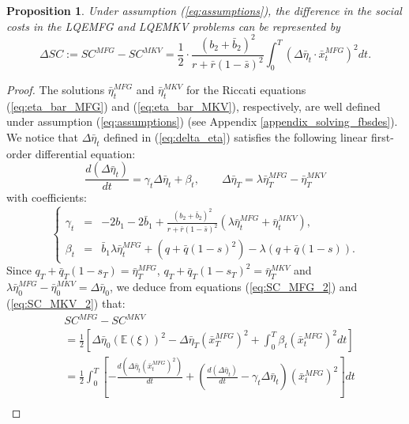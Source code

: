 \documentclass[11pt]{article}
\newtheorem{proposition}{Proposition}
\begin{document}
\begin{proposition}
	Under assumption (\ref{eq:assumptions}), the difference in the social costs in the LQEMFG and LQEMKV problems can be represented by
	\begin{equation*}
		\Delta SC := SC^{MFG} - SC^{MKV} =  \frac{1}{2}\cdot \frac{(b_2 + \bar{b}_2)^2}{r + \bar{r}(1-\bar{s})^2} \int_0^T (\Delta \bar{\eta}_t \cdot \bar{x}_t^{MFG})^2 dt.
	\end{equation*}
\label{prop:diff_SC}
\end{proposition}
\begin{proof}
	The solutions $\bar{\eta}^{MFG}_t$ and $\bar{\eta}^{MKV}_t$ for the Riccati equations (\ref{eq:eta_bar_MFG}) and (\ref{eq:eta_bar_MKV}), respectively, are well defined under assumption (\ref{eq:assumptions}) (see Appendix \ref{appendix_solving_fbsdes}). We notice that $\Delta\bar{\eta}_t$ defined in (\ref{eq:delta_eta}) satisfies the following linear first-order differential equation:
	\begin{equation*}
		\frac{d( \Delta{\bar{\eta}}_t)}{dt} = \gamma_t \Delta\bar{\eta}_t + \beta_t,
		\qquad \Delta{\bar{\eta}}_T = \lambda \bar{\eta}_T^{MFG} - \bar{\eta}_T^{MKV}
	\end{equation*}
	with coefficients:
	\begin{equation*}
	\left\{
		\begin{array}{rcl}
			\gamma_t &=& \displaystyle -2 b_1 - 2\bar{b}_1 + \frac{(b_2 + \bar{b}_2)^2}{r + \bar{r}(1-\bar{s})^2} \left(\lambda \bar{\eta}_t^{MFG} + \bar{\eta}_t^{MKV} \right),\\
			\beta_t &=& \bar{b}_1 \lambda \bar{\eta}_t^{MFG} + (q + \bar{q}(1-s)^2) - \lambda (q + \bar{q}(1-s)).
		\end{array}
	\right.
	\end{equation*} 
	Since $q_T + \bar{q}_T(1-s_T) = \bar{\eta}_T^{MFG}$, $q_T + \bar{q}_T(1-s_T)^2 = \bar{\eta}_T^{MKV}$ and $\lambda \bar{\eta}_0^{MFG} - \bar{\eta}_0^{MKV} = \Delta\bar{\eta}_0$, we deduce from equations (\ref{eq:SC_MFG_2}) and (\ref{eq:SC_MKV_2}) that:
	\begin{equation*}
		\begin{split}
			& SC^{MFG} - SC^{MKV}\\
			&= \frac{1}{2} \left[ \Delta\bar{\eta}_0 (\mathbb{E}(\xi))^2 - \Delta\bar{\eta}_T (\bar{x}_T^{MFG})^2 + \int_0^T \beta_t (\bar{x}_t^{MFG})^2 dt \right] \\
			&= \frac{1}{2} \int_0^T \left[ - \frac{d (\Delta\bar{\eta}_t (\bar{x}_t^{MFG})^2) }{dt}  + \left( 	\frac{d( \Delta{\bar{\eta}}_t)}{dt} - \gamma_t \Delta\bar{\eta}_t  \right)(\bar{x}_t^{MFG})^2 \right] dt\\

\end{split}
\end{equation*}
\end{proof}
\end{document}
